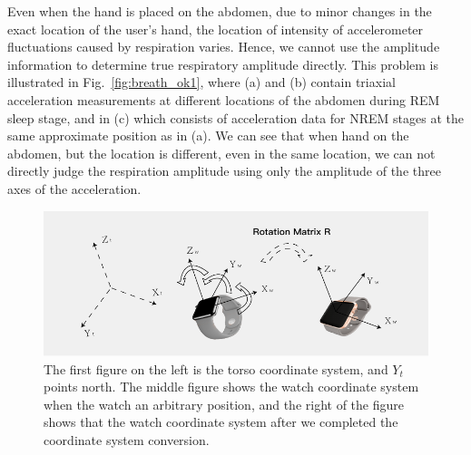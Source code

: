 Even when the hand is placed on the abdomen, due to minor changes in the exact location of the user's hand, the location of intensity of accelerometer fluctuations caused by respiration varies. Hence, we cannot use the amplitude information to determine true respiratory amplitude directly. This problem is illustrated in Fig.~\ref{fig:breath_ok1}, where (a) and (b) contain triaxial acceleration measurements at different locations of the abdomen during REM sleep stage, and in (c) which consists of acceleration data for NREM stages at the same approximate position as in (a). We can see that when hand on the abdomen, but the location is different, even in the same location, we can not directly judge the respiration amplitude using only the amplitude of the three axes of the acceleration.

\begin{figure}[!t]
\centering
      \includegraphics[width=0.67\linewidth]{Figures/watch.pdf}
  \caption{The first figure on the left is the torso coordinate system, and $Y_t$ points north. The middle figure shows the watch coordinate system when the watch an arbitrary position, and the right of the figure shows that the  watch coordinate system after we completed the coordinate system conversion.}\label{fig:watch}
\end{figure}

